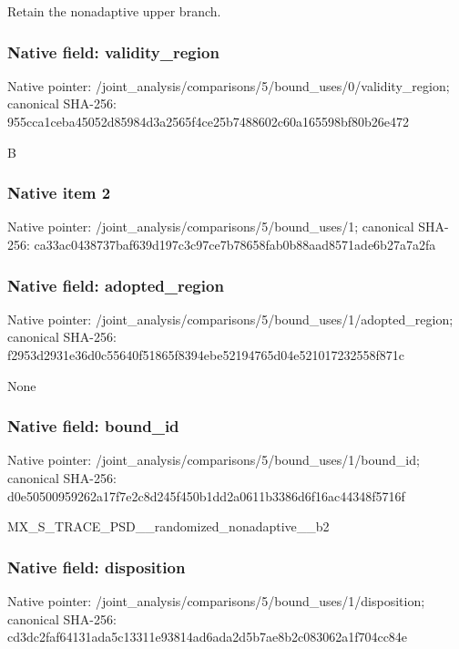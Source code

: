\documentclass[10pt,a4paper]{article}
\begin{document}
\begingroup\raggedright\sloppy Retain the nonadaptive upper branch.\par\endgroup

\subsubsection{Native field: validity\_\allowbreak{}region}
Native pointer: /joint\_\allowbreak{}analysis/comparisons/5/bound\_\allowbreak{}uses/0/validity\_\allowbreak{}region; canonical SHA-256: 955cca1ceba45052d85984d3a2565f4ce25b7488602c60a165598bf80b26e472

\begingroup\raggedright\sloppy B\par\endgroup

\subsubsection{Native item 2}
Native pointer: /joint\_\allowbreak{}analysis/comparisons/5/bound\_\allowbreak{}uses/1; canonical SHA-256: ca33ac0438737baf639d197c3c97ce7b78658fab0b88aad8571ade6b27a7a2fa

\subsubsection{Native field: adopted\_\allowbreak{}region}
Native pointer: /joint\_\allowbreak{}analysis/comparisons/5/bound\_\allowbreak{}uses/1/adopted\_\allowbreak{}region; canonical SHA-256: f2953d2931e36d0c55640f51865f8394ebe52194765d04e521017232558f871c

\begingroup\raggedright\sloppy None\par\endgroup

\subsubsection{Native field: bound\_\allowbreak{}id}
Native pointer: /joint\_\allowbreak{}analysis/comparisons/5/bound\_\allowbreak{}uses/1/bound\_\allowbreak{}id; canonical SHA-256: d0e50500959262a17f7e2c8d245f450b1dd2a0611b3386d6f16ac44348f5716f

\begingroup\raggedright\sloppy MX\_\allowbreak{}S\_\allowbreak{}TRACE\_\allowbreak{}PSD\_\allowbreak{}\_\allowbreak{}randomized\_\allowbreak{}nonadaptive\_\allowbreak{}\_\allowbreak{}b2\par\endgroup

\subsubsection{Native field: disposition}
Native pointer: /joint\_\allowbreak{}analysis/comparisons/5/bound\_\allowbreak{}uses/1/disposition; canonical SHA-256: cd3dc2faf64131ada5c13311e93814ad6ada2d5b7ae8b2c083062a1f704cc84e
\end{document}
